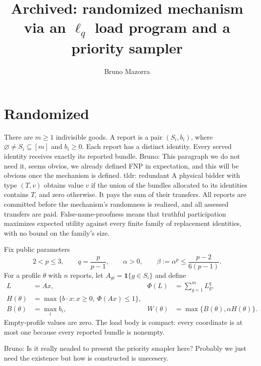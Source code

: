 \documentclass[11pt]{article}
\title{Archived: randomized mechanism via an $\ell_q$ load program and a priority sampler}
\author{Bruno Mazorra}
\date{}
\newcommand{\bruno}[1]{{\color{red}Bruno: #1}}
\begin{document}
\maketitle

\section{Randomized}

There are $m\ge1$ indivisible goods. A report is a pair $(S_i,b_i)$,
where $\varnothing\ne S_i\subseteq[m]$ and $b_i\ge0$.
Each report has a distinct identity.
Every served identity receives exactly its reported bundle.
\bruno{This paragraph we do not need it, seems obvios, we already defined FNP in expectation, and this will be obvious once the mechanism is defined. tldr: redundant}
A physical bidder with type $(T,v)$ obtains value $v$ if the union
of the bundles allocated to its identities contains $T$, and zero
otherwise. It pays the sum of their transfers.
All reports are committed before the mechanism's randomness is
realized, and all assessed transfers are paid.
False-name-proofness means that truthful participation maximizes
expected utility against every finite family of replacement
identities, with no bound on the family's size.

Fix public parameters
\begin{equation}
\label{eq:parameters}
2<p\le3,
\qquad
q=\frac p{p-1},
\qquad
\alpha>0,
\qquad
\beta:=\alpha^p\le\frac{p-2}{6(p-1)}.
\end{equation}
For a profile $\theta$ with $n$ reports, let
$A_{gi}=\mathbf{1}\{g\in S_i\}$ and define
\begin{align}
L&=Ax,
&
\Phi(L)&=\sum_{g=1}^m L_g^q,
\nonumber\\
H(\theta)
&=\max\{b\cdot x:x\ge0,\ \Phi(Ax)\le1\},
\label{eq:program}\\
B(\theta)&=\max_i b_i,
&
W(\theta)&=\max\{B(\theta),\alpha H(\theta)\}.
\label{eq:support}
\end{align}
Empty-profile values are zero.
The load body is compact: every coordinate is at most one because
every reported bundle is nonempty.

\bruno{Is it really neaded to present the priority smapler here? Probably we just need the existence but how is constructed is unecesery.}
\end{document}
